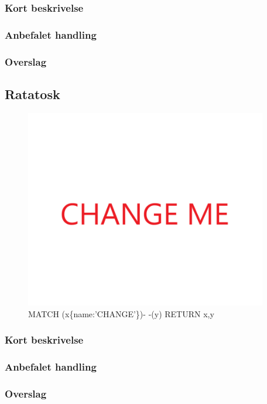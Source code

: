 \documentclass{article}
\begin{document}
\subsubsection{Kort beskrivelse}
\subsubsection{Anbefalet handling}
\subsubsection{Overslag}
\subsection{Ratatosk}
\begin{figure}[h]
\includegraphics[width=300pt]{CHANGE.PNG}
\caption{MATCH (x\{name:'CHANGE'\})- -(y) RETURN x,y}
\end{figure}
\subsubsection{Kort beskrivelse}
\subsubsection{Anbefalet handling}
\subsubsection{Overslag}
\end{document}
